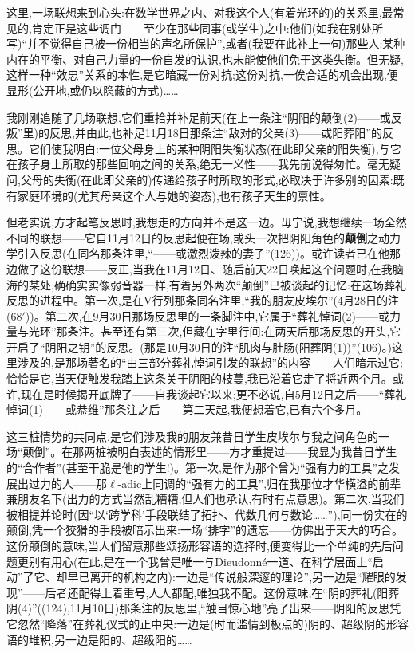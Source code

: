这里,一场联想来到心头:在数学世界之内、对我这个人(有着光环的)的关系里,最常见的,肯定正是这些调门——至少在那些同事(或学生)之中:他们(如我在别处所写)“并不觉得自己被一份相当的声名所保护”,或者(我要在此补上一句)那些人:某种内在的平衡、对自己力量的一份自发的认识,也未能使他们免于这类失衡。但无疑,这样一种“效忠”关系的本性,是它暗藏一份对抗;这份对抗,一俟合适的机会出现,便显形(公开地,或仍以隐蔽的方式)\dmark{}……

我刚刚追随了几场联想,它们重拾并补足前天(在上一条注“阴阳的颠倒(2)——或反叛”里)的反思,并由此,也补足11月18日那条注“敌对的父亲(3)——或阳葬阳”的反思。它们使我明白:一位父母身上的某种阴阳失衡状态(在此即父亲的阳失衡),与它在孩子身上所取的那些回响之间的关系,绝无一义性——我先前说得匆忙。毫无疑问,父母的失衡(在此即父亲的)传递给孩子时所取的形式,必取决于许多别的因素:既有家庭环境的(尤其母亲这个人与她的姿态),也有孩子天生的禀性。

但老实说,方才起笔反思时,我想走的方向并不是这一边。毋宁说,我想继续一场全然不同的联想——它自11月12日的反思起便在场,或头一次把阴阳角色的\textbf{颠倒}之动力学引入反思(在同名那条注里,“——或激烈泼辣的妻子”(126))。或许读者已在他那边做了这份联想——反正,当我在11月12日、随后前天22日唤起这个问题时,在我脑海的某处,确确实实像弱音器一样,有着另外两次“颠倒”已被谈起的记忆:在这场葬礼反思的进程中。第一次,是在V行列那条同名注里,“我的朋友皮埃尔”(4月28日的注(68$'$))。第二次,在9月30日那场反思里的一条脚注中,它属于“葬礼悼词(2)——或力量与光环”那条注。甚至还有第三次,但藏在字里行间:在两天后那场反思的开头,它开启了“阴阳之钥”的反思。(那是10月30日的注“肌肉与肚肠(阳葬阴(1))”(106)。)\dmark{}这里涉及的,是那场著名的“由三部分葬礼悼词引发的联想”的内容——人们暗示过它;恰恰是它,当天便触发我踏上这条关于阴阳的枝蔓,我已沿着它走了将近两个月。或许,现在是时候揭开底牌了——自我谈起它以来;更不必说,自5月12日之后——“葬礼悼词(1)——或恭维”那条注之后——第二天起,我便想着它,已有六个多月。

这三桩情势的共同点,是它们涉及我的朋友兼昔日学生皮埃尔与我之间角色的一场“颠倒”。在那两桩被明白表述的情形里——方才重提过——我显为我昔日学生的“合作者”(甚至干脆是他的学生!)。第一次,是作为那个曾为“强有力的工具”之发展出过力的人——那$\ell$-adic上同调的“强有力的工具”,归在我那位才华横溢的前辈兼朋友名下(出力的方式当然乱糟糟,但人们也承认,有时有点意思)。第二次,当我们被相提并论时(因“以‘跨学科’手段联结了拓扑、代数几何与数论……”),同一份实在的颠倒,凭一个狡猾的手段被暗示出来:一场“排字”的遗忘——仿佛出于天大的巧合。这份颠倒的意味,当人们留意那些颂扬形容语的选择时,便变得比一个单纯的先后问题更别有用心(在此,是在一个我曾是唯一与Dieudonné一道、在科学层面上“启动”了它、却早已离开的机构之内):一边是“传说般深邃的理论”,另一边是“耀眼的发现”——后者还配得上着重号,人人都配,唯独我不配。这份意味,在“阴的葬礼(阳葬阴(4)”((124),11月10日)那条注的反思里,“触目惊心地”亮了出来——阴阳的反思凭它忽然“降落”在葬礼仪式的正中央:一边是(时而滥情到极点的)阴的、超级阴的形容语的堆积,另一边是阳的、超级阳的……

